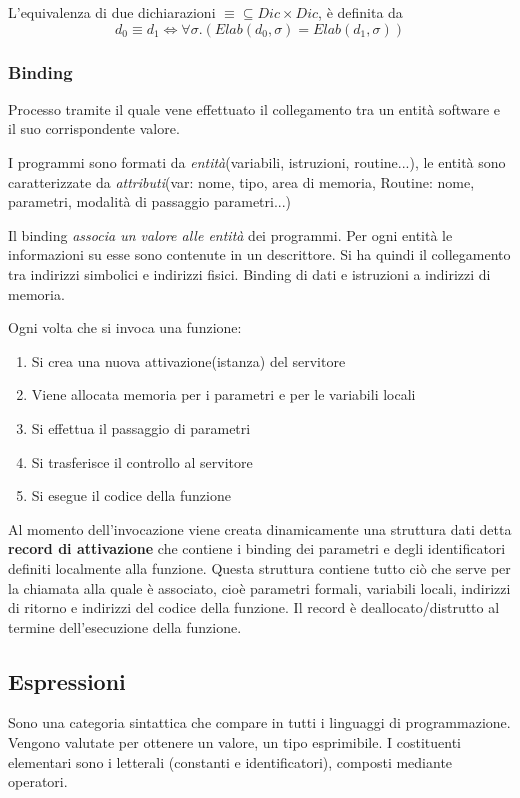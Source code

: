 \documentclass[a4paper, 10pt]{article}
\begin{document}
	L'equivalenza di due dichiarazioni $\equiv \subseteq Dic \times Dic$, è definita da $$d_0 \equiv d_1 \iff \forall \sigma.(Elab(d_0,\sigma) = Elab(d_1, \sigma))$$
	
	\subsubsection{Binding}
	Processo tramite il quale vene effettuato il collegamento tra un entità software e il suo corrispondente valore.
	
	I programmi sono formati da \textit{entità}(variabili, istruzioni, routine...), le entità sono caratterizzate da \textit{attributi}(var: nome, tipo, area di memoria, Routine: nome, parametri, modalità di passaggio parametri...)
	
	Il binding \textit{associa un valore alle entità} dei programmi. Per ogni entità le informazioni su esse sono contenute in un descrittore. Si ha quindi il collegamento tra indirizzi simbolici e indirizzi fisici.
	Binding di dati e istruzioni a indirizzi di memoria.
	
	\noindent
	Ogni volta che si invoca una funzione:
	\begin{enumerate}
		\item Si crea una nuova attivazione(istanza) del servitore
		\item Viene allocata memoria per i parametri e per le variabili locali
		\item Si effettua il passaggio di parametri
		\item Si trasferisce il controllo al servitore
		\item Si esegue il codice della funzione
	\end{enumerate}
	Al momento dell'invocazione viene creata dinamicamente una struttura dati detta \textbf{record di attivazione} che contiene i binding dei parametri e degli identificatori definiti localmente alla funzione. Questa struttura contiene tutto ciò che serve per la chiamata alla quale è associato, cioè parametri formali, variabili locali, indirizzi di ritorno e indirizzi del codice della funzione.
	Il record è deallocato/distrutto al termine dell'esecuzione della funzione.
	
	\subsection{Espressioni}
	Sono una categoria sintattica che compare in tutti i linguaggi di programmazione. Vengono valutate per ottenere un valore, un tipo esprimibile. I costituenti elementari sono i letterali (constanti e identificatori), composti mediante operatori.
	
\end{document}
